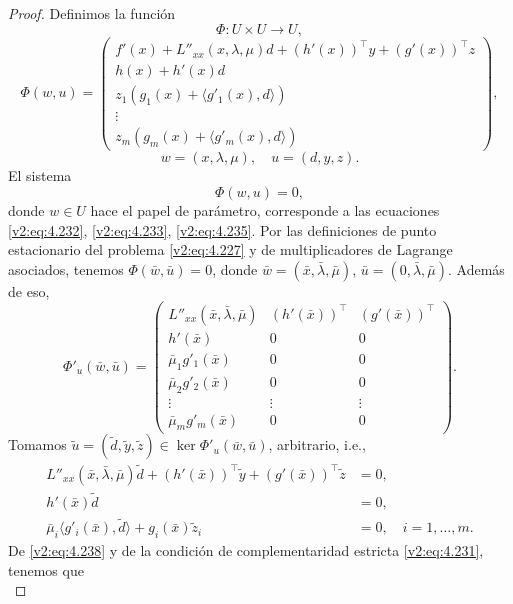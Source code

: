\begin{proof}
    Definimos la función
    \[
        \Phi \colon U \times U \to U,
    \]
    \[
        \Phi(w, u) = \begin{pmatrix} f'(x) + L''_{xx}(x, \lambda, \mu)d + (h'(x))^\top y + (g'(x))^\top z \\
        h(x) + h'(x)d \\
        z_1(g_1(x) + \langle g'_1(x), d \rangle) \\
        \vdots \\
        z_m(g_m(x) + \langle g'_m(x), d \rangle) \end{pmatrix},
    \]
    \[
        w = (x, \lambda, \mu), \quad u = (d, y, z).
    \]
    El sistema
    \[
        \Phi(w, u) = 0,
    \]
    donde $w \in U$ hace el papel de parámetro, corresponde a las ecuaciones \eqref{v2:eq:4.232}, \eqref{v2:eq:4.233}, \eqref{v2:eq:4.235}.
    Por las definiciones de punto estacionario del problema \eqref{v2:eq:4.227} y de multiplicadores de Lagrange asociados, tenemos $\Phi(\bar{w}, \bar{u}) = 0$, donde $\bar{w} = (\bar{x}, \bar{\lambda}, \bar{\mu})$, $\bar{u} = (0, \bar{\lambda}, \bar{\mu})$. Además de eso,
    \[
        \Phi'_u(\bar{w}, \bar{u}) = \begin{pmatrix} L''_{xx}(\bar{x}, \bar{\lambda}, \bar{\mu}) & (h'(\bar{x}))^\top & (g'(\bar{x}))^\top \\
        h'(\bar{x}) & 0 & 0 \\
        \bar{\mu}_1 g'_1(\bar{x}) & 0 & 0 \\
        \bar{\mu}_2 g'_2(\bar{x}) & 0 & 0 \\
        \vdots & \vdots & \vdots \\
        \bar{\mu}_m g'_m(\bar{x}) & 0 & 0 \end{pmatrix}.
    \]
    Tomamos $\tilde{u} = (\tilde{d}, \tilde{y}, \tilde{z}) \in \ker \Phi'_u(\bar{w}, \bar{u})$, arbitrario, i.e.,
    \begin{align}
        L''_{xx}(\bar{x}, \bar{\lambda}, \bar{\mu})\tilde{d} + (h'(\bar{x}))^\top \tilde{y} + (g'(\bar{x}))^\top \tilde{z} &= 0, \label{v2:eq:4.236} \\
        h'(\bar{x})\tilde{d} &= 0, \label{v2:eq:4.237} \\
        \bar{\mu}_i \langle g'_i(\bar{x}), \tilde{d} \rangle + g_i(\bar{x})\tilde{z}_i &= 0, \quad i = 1, \dots, m. \label{v2:eq:4.238}
    \end{align}
    De \eqref{v2:eq:4.238} y de la condición de complementaridad estricta \eqref{v2:eq:4.231}, tenemos que
    \begin{equation}

\end{equation}
\end{proof}
